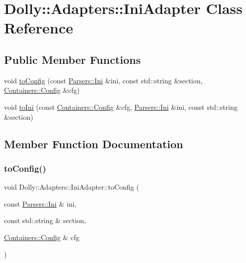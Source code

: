 \hypertarget{class_dolly_1_1_adapters_1_1_ini_adapter}{}\section{Dolly\+:\+:Adapters\+:\+:Ini\+Adapter Class Reference}
\label{class_dolly_1_1_adapters_1_1_ini_adapter}
\subsection*{Public Member Functions}
\begin{DoxyCompactItemize}
\item 
void \hyperlink{class_dolly_1_1_adapters_1_1_ini_adapter_a23c8c3cd1d3d57f58191b18f9c8512af}{to\+Config} (const \hyperlink{class_dolly_1_1_parsers_1_1_ini}{Parsers\+::\+Ini} \&ini, const std\+::string \&section, \hyperlink{class_dolly_1_1_containers_1_1_config}{Containers\+::\+Config} \&cfg)
\item 
void \hyperlink{class_dolly_1_1_adapters_1_1_ini_adapter_a85c38728e9239e503ae294693f537b8f}{to\+Ini} (const \hyperlink{class_dolly_1_1_containers_1_1_config}{Containers\+::\+Config} \&cfg, \hyperlink{class_dolly_1_1_parsers_1_1_ini}{Parsers\+::\+Ini} \&ini, const std\+::string \&section)
\end{DoxyCompactItemize}


\subsection{Member Function Documentation}
\mbox{\label{class_dolly_1_1_adapters_1_1_ini_adapter_a23c8c3cd1d3d57f58191b18f9c8512af}} 
\subsubsection{\texorpdfstring{to\+Config()}{toConfig()}}
{\footnotesize\ttfamily void Dolly\+::\+Adapters\+::\+Ini\+Adapter\+::to\+Config (\begin{DoxyParamCaption}\item[{const \hyperlink{class_dolly_1_1_parsers_1_1_ini}{Parsers\+::\+Ini} \&}]{ini,  }\item[{const std\+::string \&}]{section,  }\item[{\hyperlink{class_dolly_1_1_containers_1_1_config}{Containers\+::\+Config} \&}]{cfg }\end{DoxyParamCaption})}

